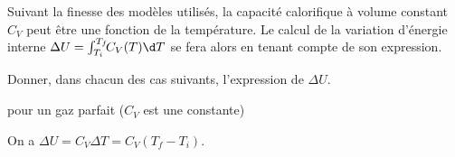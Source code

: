 


\finEntrainement





\hauteurLargeurCadreReponse		{6mm}{5cm}
\typeEntrainement				{} %
\initialisationEntrainement

Suivant la finesse des modèles utilisés, la capacité calorifique à volume constant $C_V$ peut être une fonction de la température.
Le calcul de la variation d'énergie interne $\Delta U = \int_{T_i}^{T_f} \!\! C_V(T) \d T$ se fera alors en tenant compte de son expression. 

\smallskip
 
Donner, dans chacun des cas suivants, l'expression de $\Delta U $. 

\debutEntrainement


\begin{enonce}
pour un gaz parfait ($C_V$ est une constante)
\end{enonce}


\begin{corrige}
	On a $\Delta U =C_V \Delta T =C_V (T_f - T_i)$.
\end{corrige}


